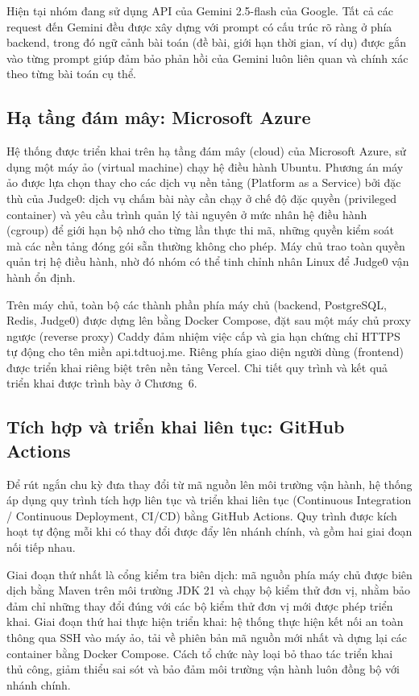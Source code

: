 \documentclass[12pt, a4paper]{report}
\begin{document}
Hiện tại nhóm đang sử dụng API của Gemini 2.5-flash của Google. Tất cả các request đến Gemini đều được xây dựng 
với prompt có cấu trúc rõ ràng ở phía backend, trong đó ngữ cảnh bài toán (đề bài, giới hạn thời gian, ví dụ) được 
gắn vào từng prompt giúp đảm bảo phản hồi của Gemini luôn liên quan và chính xác theo từng bài toán cụ thể.

\subsection{Hạ tầng đám mây: Microsoft Azure}

Hệ thống được triển khai trên hạ tầng đám mây (cloud) của Microsoft Azure, sử dụng một máy ảo (virtual machine) chạy hệ điều hành Ubuntu. 
Phương án máy ảo được lựa chọn thay cho các dịch vụ nền tảng (Platform as a Service) bởi đặc thù của Judge0: dịch vụ chấm bài
này cần chạy ở chế độ đặc quyền (privileged container) và yêu cầu trình quản lý tài nguyên
ở mức nhân hệ điều hành (cgroup) để giới hạn bộ nhớ cho từng lần thực thi mã, những quyền
kiểm soát mà các nền tảng đóng gói sẵn thường không cho phép. Máy chủ trao toàn quyền
quản trị hệ điều hành, nhờ đó nhóm có thể tinh chỉnh nhân Linux để Judge0 vận hành ổn định.

Trên máy chủ, toàn bộ các thành phần phía máy chủ (backend, PostgreSQL, Redis, Judge0) được
dựng lên bằng Docker Compose, đặt sau một máy chủ proxy ngược (reverse proxy) Caddy đảm nhiệm
việc cấp và gia hạn chứng chỉ \ac{HTTPS} tự động cho tên miền api.tdtuoj.me. Riêng
phía giao diện người dùng (frontend) được triển khai riêng biệt trên nền tảng Vercel. Chi
tiết quy trình và kết quả triển khai được trình bày ở Chương~6.

\subsection{Tích hợp và triển khai liên tục: GitHub Actions}

Để rút ngắn chu kỳ đưa thay đổi từ mã nguồn lên môi trường vận hành, hệ thống áp dụng quy
trình tích hợp liên tục và triển khai liên tục (Continuous Integration / Continuous
Deployment, \ac{CI/CD}) bằng GitHub Actions. Quy trình được kích hoạt tự động mỗi khi có
thay đổi được đẩy lên nhánh chính, và gồm hai giai đoạn nối tiếp nhau.

Giai đoạn thứ nhất là cổng kiểm tra biên dịch: mã nguồn phía máy chủ được biên dịch bằng
Maven trên môi trường \ac{JDK} 21 và chạy bộ kiểm thử đơn vị, nhằm bảo đảm chỉ những thay
đổi đúng với các bộ kiểm thử đơn vị mới được phép triển khai. Giai đoạn thứ hai thực hiện triển khai: hệ
thống thực hiện kết nối an toàn thông qua \ac{SSH} vào máy ảo, tải về phiên bản mã nguồn mới nhất và
dựng lại các container bằng Docker Compose. Cách tổ chức này loại bỏ thao tác triển khai
thủ công, giảm thiểu sai sót và bảo đảm môi trường vận hành luôn đồng bộ với nhánh chính.
\end{document}
